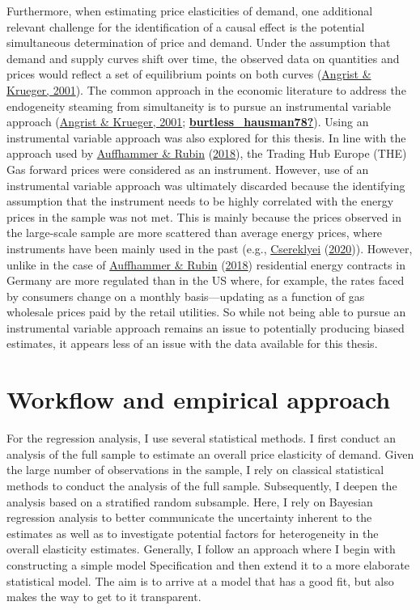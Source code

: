 \documentclass[12pt,twoside]{reedthesis}
\begin{document}
Furthermore, when estimating price elasticities of demand, one additional relevant challenge for the identification of a causal effect is the potential simultaneous determination of price and demand. Under the assumption that demand and supply curves shift over time, the observed data on quantities and prices would reflect a set of equilibrium points on both curves (\protect\hyperlink{ref-angrist_krueger01}{Angrist \& Krueger, 2001}). The common approach in the economic literature to address the endogeneity steaming from simultaneity is to pursue an instrumental variable approach (\protect\hyperlink{ref-angrist_krueger01}{Angrist \& Krueger, 2001}; \protect\hyperlink{ref-burtless_hausman78}{\textbf{burtless\_hausman78?}}). Using an instrumental variable approach was also explored for this thesis. In line with the approach used by \protect\hyperlink{ref-auffhammer_rubin18}{Auffhammer \& Rubin} (\protect\hyperlink{ref-auffhammer_rubin18}{2018}), the Trading Hub Europe (THE) Gas forward prices were considered as an instrument. However, use of an instrumental variable approach was ultimately discarded because the identifying assumption that the instrument needs to be highly correlated with the energy prices in the sample was not met. This is mainly because the prices observed in the large-scale sample are more scattered than average energy prices, where instruments have been mainly used in the past (e.g., \protect\hyperlink{ref-csereklyei20}{Csereklyei} (\protect\hyperlink{ref-csereklyei20}{2020})). However, unlike in the case of \protect\hyperlink{ref-auffhammer_rubin18}{Auffhammer \& Rubin} (\protect\hyperlink{ref-auffhammer_rubin18}{2018}) residential energy contracts in Germany are more regulated than in the US where, for example, the rates faced by consumers change on a monthly basis---updating as a function of gas wholesale prices paid by the retail utilities. So while not being able to pursue an instrumental variable approach remains an issue to potentially producing biased estimates, it appears less of an issue with the data available for this thesis.

\hypertarget{workflow-empirical-approach}{%
\section{Workflow and empirical approach}\label{workflow-empirical-approach}}

For the regression analysis, I use several statistical methods. I first conduct an analysis of the full sample to estimate an overall price elasticity of demand. Given the large number of observations in the sample, I rely on classical statistical methods to conduct the analysis of the full sample. Subsequently, I deepen the analysis based on a stratified random subsample. Here, I rely on Bayesian regression analysis to better communicate the uncertainty inherent to the estimates as well as to investigate potential factors for heterogeneity in the overall elasticity estimates. Generally, I follow an approach where I begin with constructing a simple model Specification and then extend it to a more elaborate statistical model. The aim is to arrive at a model that has a good fit, but also makes the way to get to it transparent.
\end{document}
